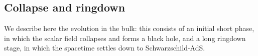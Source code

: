 \documentclass[a4paper,11pt]{article}
\numberwithin{equation}{section}
\begin{document}






\subsection{Collapse and ringdown}\label{sec:rescolring}

We describe here the evolution in the bulk: this  consists of an initial  short phase, in which the scalar field collapses and forms a black hole, and a long ringdown stage, in which the spacetime settles down to Schwarzschild-AdS. 

\end{document}

